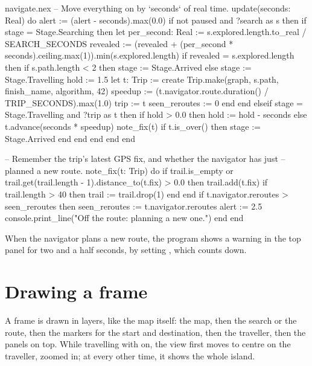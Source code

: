 \begin{continued}{navigate.nex}
  -- Move everything on by `seconds` of real time.
  update(seconds: Real) do
    alert := (alert - seconds).max(0.0)
    if not paused and ?search as s then
      if stage = Stage.Searching then
        let per_second: Real := s.explored.length.to_real / SEARCH_SECONDS
        revealed := (revealed + (per_second * seconds).ceiling.max(1)).min(s.explored.length)
        if revealed = s.explored.length then
          if s.path.length < 2 then
            stage := Stage.Arrived
          else
            stage := Stage.Travelling
            hold := 1.5
            let t: Trip := create Trip.make(graph, s.path, finish_name, algorithm, 42)
            speedup := (t.navigator.route.duration() / TRIP_SECONDS).max(1.0)
            trip := t
            seen_reroutes := 0
          end
        end
      elseif stage = Stage.Travelling and ?trip as t then
        if hold > 0.0 then
          hold := hold - seconds
        else
          t.advance(seconds * speedup)
          note_fix(t)
          if t.is_over() then
            stage := Stage.Arrived
          end
        end
      end
    end
  end

  -- Remember the trip's latest GPS fix, and whether the navigator has just
  -- planned a new route.
  note_fix(t: Trip) do
    if trail.is_empty or trail.get(trail.length - 1).distance_to(t.fix) > 0.0 then
      trail.add(t.fix)
      if trail.length > 40 then
        trail := trail.drop(1)
      end
    end
    if t.navigator.reroutes > seen_reroutes then
      seen_reroutes := t.navigator.reroutes
      alert := 2.5
      console.print_line("Off the route: planning a new one.")
    end
  end
\end{continued}

When the navigator plans a new route, the program shows a warning in the
top panel for two and a half seconds, by setting , which
 counts down.

\section{Drawing a frame}

A frame is drawn in layers, like the map itself: the map, then the search
or the route, then the markers for the start and destination, then the
traveller, then the panels on top. While travelling with 
on, the view first moves to centre on the traveller, zoomed in; at every
other time, it shows the whole island.

